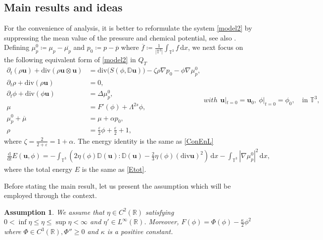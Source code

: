 \documentclass[reqno,a4paper,11pt]{amsart}
\theoremstyle{plain}
\newtheorem{assumption}[theorem]{Assumption}
\numberwithin{equation}{section}
\newcommand{\bb}[1]{\mathbb{#1}}
\newcommand{\bbt}{\bb{T}}
\newcommand{\absm}[1]{\vert #1 \vert}
\begin{document}
	\subsection{Main results and ideas}
	For the convenience of analysis, it is better to reformulate the system \eqref{model2} by suppressing the mean value of the pressure and chemical potential, see also \cite{AH}.
	Defining $\mu_p^{0}\coloneqq\mu_p-\overline{\mu_p}$ and $p_0\coloneqq p-\overline{p}$  where $\overline{f}\coloneqq\frac{1}{\absm{\bbt^3}}\int_{\bbt^3} f \,\mathrm{d}x$,
	we next focus on the following equivalent form of  \eqref{model2} in $Q_T$
	\begin{subequations}
		\label{model3}
		\begin{align}
			\label{model3-1}
			\partial_t(\rho  \mathbf{u}) + \mathrm{div}\left (\rho  \mathbf{u}\otimes
			\mathbf{u}\right) & = \mathrm{div}\big(S(\phi,\mathbb{ D}\mathbf{u})\big) -\zeta\rho\nabla p_{0}
			- \phi \nabla \mu_{p}^{0}, \\
			\label{model3-2}
			\partial_t \rho+\mathrm{div} (\rho \mathbf{u})& =0, \\
			\label{model3-3}
			\partial_t\phi + \mathrm{div}(\phi  \mathbf{u})& =\Delta\mu_p^{0}, \\
			\label{model3-4}
			\mu& =F'(\phi)+\Lambda^{2s} \phi , \\
			\label{model3-5}
			\mu_p^{0}+\overline{\mu}& =\mu+\alpha p_{0}, \\
			\rho & =\frac{\varepsilon}{2}\phi+\frac{\varepsilon}{2}+1, 
		\end{align}
		with \begin{align}
			\label{model3-5-0}
			\mathbf{u}|_{t=0} =\mathbf{u}_{0},\ \phi|_{t=0}=\phi_{0}, \quad\text{in $\bbt^3$},
		\end{align}
	\end{subequations}
	where $\zeta=\frac{2}{2+\varepsilon}=1+\alpha$. The energy identity is the same as \eqref{ConEnL}
	\begin{align}\label{ConEnL1}
		\frac{\mathrm d}{\mathrm dt}E(\mathbf{u}, \phi)
		=
		-\int_{\mathbb{T}^{3}} \left( 2 \eta(\phi)
		\mathbb{ D}(\mathbf{u}):\mathbb{ D}(\mathbf{u})-\frac{2}{3}\eta(\phi) (\mathrm{div} \mathbf{u})^2\right)\, \mathrm{d} x
		-\int_{\mathbb{T}^{3}} |\nabla \mu_p^{0}|^2\, \mathrm{d} x,
	\end{align}
	where the total energy $E$ is the same as \eqref{Etot}.
	
	Before stating the main result, let us present the assumption which will be employed through the context.
	\begin{assumption}\label{ass:main}
		We assume that $\eta\in C^{2}(\mathbb{R})$ satisfying 
		$0<\inf\eta\leq \eta\leq \sup \eta<\infty$ and $\eta'\in L^\infty(\mathbb{R})$. Moreover, $F(\phi)=\Phi(\phi)-\frac{\kappa}{2}\phi^{2}$ where $\Phi \in C^{3}(\mathbb{R}),\Phi''\geq 0$ and $\kappa$ is a positive constant.
	\end{assumption}
	
\end{document}
